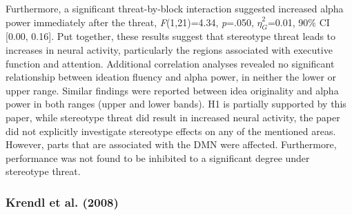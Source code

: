\documentclass[
  stu,floatsintext]{apa7}
\begin{document}
Furthermore, a significant threat-by-block interaction suggested increased alpha power immediately after the threat, \emph{F}(1,21)=4.34, \emph{p}=.050, \(\hat{\eta}^{2}_{G}\)=0.01, 90\% CI {[}0.00, 0.16{]}.
Put together, these results suggest that stereotype threat leads to increases in neural activity, particularly the regions associated with executive function and attention.
Additional correlation analyses revealed no significant relationship between ideation fluency and alpha power, in neither the lower or upper range.
Similar findings were reported between idea originality and alpha power in both ranges (upper and lower bands).
H1 is partially supported by this paper, while stereotype threat did result in increased neural activity, the paper did not explicitly investigate stereotype effects on any of the mentioned areas. However, parts that are associated with the DMN were affected. Furthermore, performance was not found to be inhibited to a significant degree under stereotype threat.

\subsubsection{Krendl et al. (2008)}\label{krendlnegativeconsequencesthreat2008}
\end{document}
